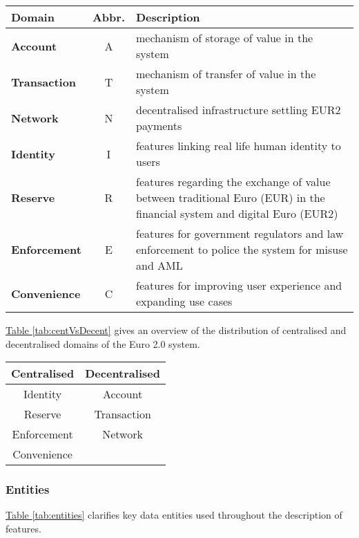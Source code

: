 \documentclass[12pt]{article} %
\newcommand{\hypertableref}[1]{\hyperref[#1]{Table \ref{#1}}}
\begin{document}
{{\begin{center}
\begin{tabular}{ | l | c | p{10cm} | }
 \hline
 Domain & Abbr. & Description \\
 \hline
 \textbf{Account} & A & mechanism of storage of value in the system
 \\ \hline
 \textbf{Transaction} & T & mechanism of transfer of value in the system
 \\ \hline
 \textbf{Network} & N & decentralised infrastructure settling EUR2 payments
 \\ \hline
 \textbf{Identity} & I & features linking real life human identity to users
 \\ \hline
 \textbf{Reserve} & R & features regarding the exchange of value between traditional Euro (EUR) in the financial system and digital Euro (EUR2)
 \\ \hline
 \textbf{Enforcement} & E & features for government regulators and law enforcement to police the system for misuse and AML
 \\ \hline
 \textbf{Convenience} & C & features for improving user experience and expanding use cases
 \\ \hline
\end{tabular}
\end{center}
\label{tab:domains}

\hypertableref{tab:centVsDecent} gives an overview of the distribution of centralised and decentralised domains of the Euro 2.0 system.

\begin{center}
\begin{tabular}{ |c|c| }
 \hline
 Centralised & Decentralised \\
 \hline
 Identity & Account \\
 Reserve & Transaction \\
 Enforcement & Network \\
 Convenience & \\
 \hline
\end{tabular}
\end{center}
\label{tab:centVsDecent}

\subsubsection{Entities} \label{sssec:3.3:entities}

\hypertableref{tab:entities} clarifies key data entities used throughout the description of features.

}}
\end{document}

